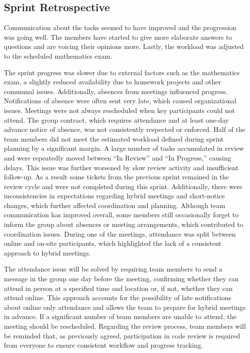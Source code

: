 \subsection*{Sprint Retrospective}
Communication about the tasks seemed to have improved and the progression was going well. The members have started to give more elaborate answers to questions and are voicing their opinions more. Lastly, the workload was adjusted to the scheduled mathematics exam.\par
The sprint progress was slower due to external factors such as the mathematics exam, a slightly reduced availability due to homework projects and other communal issues. Additionally, absences from meetings influenced progress. Notifications of absence were often sent very late, which caused organizational issues. Meetings were not always rescheduled when key participants could not attend. The group contract, which requires attendance and at least one-day advance notice of absence, was not consistently respected or enforced. Half of the team members did not meet the estimated workload defined during sprint planning by a significant margin. A large number of tasks accumulated in review and were repeatedly moved between “In Review” and “In Progress,” causing delays. This issue was further worsened by slow review activity and insufficient follow-up. As a result some tickets from the previous sprint remained in the review cycle and were not completed during this sprint. Additionally, there were inconsistencies in expectations regarding hybrid meetings and short-notice changes, which further affected coordination and planning. Although team communication has improved overall, some members still occasionally forget to inform the group about absences or meeting arrangements, which contributed to coordination issues. During one of the meetings, attendance was split between online and on-site participants, which highlighted the lack of a consistent approach to hybrid meetings.\par
The attendance issue will be solved by requiring team members to send a message in the group one day before the meeting, confirming whether they can attend in person at a specified time and location or, if not, whether they can attend online. This approach accounts for the possibility of late notifications about online only attendance and allows the team to prepare for hybrid meetings in advance. If a significant number of team members are unable to attend, the meeting should be rescheduled. Regarding the review process, team members will be reminded that, as previously agreed, participation in code review is required from everyone to ensure consistent workflow and progress tracking. 

